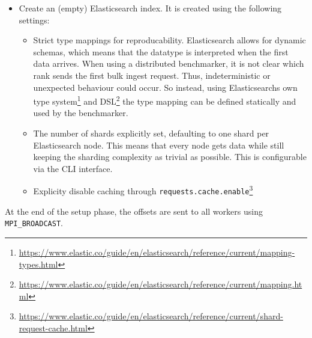\begin{itemize}
  \item Create an (empty) Elasticsearch index. It is created using the following settings:
    \begin{itemize}
      \item Strict type mappings for reproducability. Elasticsearch allows for dynamic schemas, which means that the datatype is interpreted when the first data arrives. When using a distributed benchmarker, it is not clear which rank sends the first bulk ingest request. Thus, indeterministic or unexpected behaviour could occur. So instead, using Elasticsearchs own type system\footnote{\url{https://www.elastic.co/guide/en/elasticsearch/reference/current/mapping-types.html}} and \ac{DSL}\footnote{\url{https://www.elastic.co/guide/en/elasticsearch/reference/current/mapping.html}} the type mapping can be defined statically and used by the benchmarker.
      \item The number of shards explicitly set, defaulting to one shard per Elasticsearch node. This means that every node gets data while still keeping the sharding complexity as trivial as possible. This is configurable via the \ac{CLI} interface.
      \item Explicity disable caching through \texttt{requests.cache.enable}\footnote{\url{https://www.elastic.co/guide/en/elasticsearch/reference/current/shard-request-cache.html}}
    \end{itemize}
\end{itemize}
At the end of the setup phase, the offsets are sent to all workers using \texttt{MPI\_BROADCAST}.

